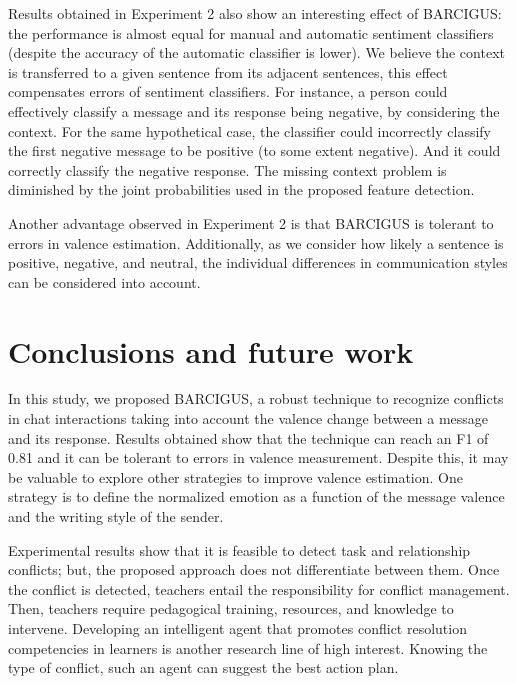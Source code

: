 \documentclass[3p,times,preprint]{elsarticle}
\begin{document}
Results obtained in Experiment 2 also show an interesting effect of BARCIGUS: the performance is almost equal for manual and automatic sentiment classifiers (despite the accuracy of the automatic classifier is lower). We believe the context is transferred to a given sentence from its adjacent sentences, this effect compensates errors of sentiment classifiers. For instance, a person could effectively classify a message and its response being negative, by considering the context.  For the same hypothetical case, the classifier could incorrectly classify the first negative message to be positive (to some extent negative). And it could correctly classify the negative response. The missing context problem is diminished by the joint probabilities used in the proposed feature detection. 

Another advantage observed in Experiment 2 is that BARCIGUS is tolerant to errors in valence estimation. Additionally, as we consider how likely a sentence is positive, negative, and neutral,  the individual differences in communication styles can be considered into account. 


\section{Conclusions and future work} \label{conclusion}
In this study, we proposed BARCIGUS, a robust technique to recognize conflicts in chat interactions taking into account the valence change between a message and its response. Results obtained show that the technique can reach an F1 of 0.81 and it can be tolerant to errors in valence measurement. \textcolor{coolblack}{
 Despite this, it may be valuable to explore other strategies to improve valence estimation. One strategy is to define the normalized emotion as a function of the message valence and the writing style of the sender.}


\textcolor{coolblack}{
Experimental results show that it is feasible to detect task and relationship conflicts; but, the proposed approach does not differentiate between them.  Once the conflict is detected, teachers entail the responsibility for conflict management. Then, teachers require pedagogical training, resources, and knowledge to intervene. Developing an intelligent agent that promotes conflict resolution competencies in learners is another research line of high interest.  Knowing the type of conflict, such an agent can suggest the best action plan.}
\end{document}

